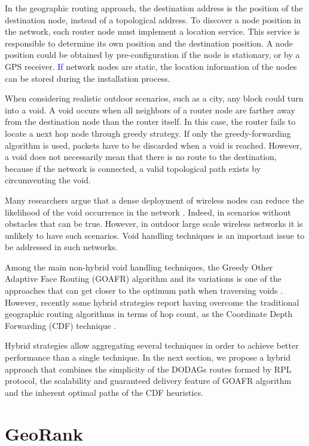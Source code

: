\documentclass[final,authoryear,3p,twocolumn]{elsarticle}
\newcommand{\rev}{\textcolor{blue}}
\begin{document}
In the geographic routing approach, the destination address is the position of the destination node, instead of a topological address. To discover a node position in the network, each router node must implement a location service. This service is responsible to determine its own position and the destination position. A node position could be obtained by pre-configuration if the node is stationary, or by a GPS receiver. \rev{If} network nodes are static, the location information of the nodes can be stored during the installation process. 

When considering realistic outdoor scenarios, such as a city, any block could turn into a void. A void occurs when all neighbors of a router node are farther away from the destination node than the router itself. In this case, the router fails to locate a next hop node through greedy strategy. If only the greedy-forwarding algorithm is used, packets have to be discarded when a void is reached. However, a void does not necessarily mean that there is no route to the destination, because if the network is connected, a valid topological path exists by circumventing the void. 

Many researchers argue that a dense deployment of wireless nodes can reduce the likelihood of the void occurrence in the network \citep{survey_2007,WSN_routing}. Indeed, in scenarios without obstacles that can be true. However, in outdoor large scale wireless networks it is unlikely to have such scenarios. Void handling techniques is an important issue to be addressed in such networks. 

Among the main non-hybrid void handling techniques, the Greedy Other Adaptive Face Routing (GOAFR) algorithm and its variations is one of the approaches that can get closer to the optimum path when traversing voids \citep{GOAFR_2008}. However, recently some hybrid strategies report having overcome the traditional geographic routing algorithms in terms of hop count, as the Coordinate Depth Forwarding (CDF) technique \citep{Denardin2011}.

Hybrid strategies allow aggregating several techniques in order to achieve better performance than a single technique. In the next section, we propose a hybrid approach that combines the simplicity of the DODAGs routes formed by RPL protocol, the scalability and guaranteed delivery feature of GOAFR algorithm and the inherent optimal paths of the CDF heuristics.

\section{GeoRank}
\label{secGeoRank}
\end{document}
